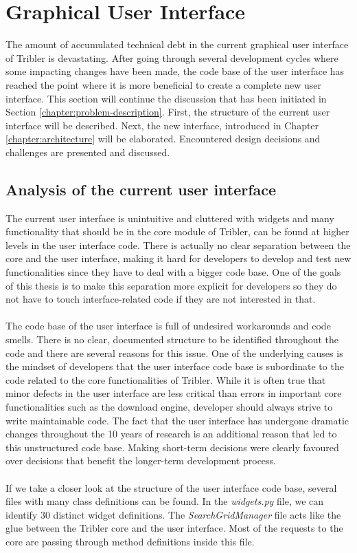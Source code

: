 \section{Graphical User Interface}
The amount of accumulated technical debt in the current graphical user interface of Tribler is devastating. After going through several development cycles where some impacting changes have been made, the code base of the user interface has reached the point where it is more beneficial to create a complete new user interface. This section will continue the discussion that has been initiated in Section \ref{chapter:problem-description}. First, the structure of the current user interface will be described. Next, the new interface, introduced in Chapter \ref{chapter:architecture} will be elaborated. Encountered design decisions and challenges are presented and discussed.

\subsection{Analysis of the current user interface}
The current user interface is unintuitive and cluttered with widgets and many functionality that should be in the core module of Tribler, can be found at higher levels in the user interface code. There is actually no clear separation between the core and the user interface, making it hard for developers to develop and test new functionalities since they have to deal with a bigger code base. One of the goals of this thesis is to make this separation more explicit for developers so they do not have to touch interface-related code if they are not interested in that.\\\\
The code base of the user interface is full of undesired workarounds and code smells. There is no clear, documented structure to be identified throughout the code and there are several reasons for this issue. One of the underlying causes is the mindset of developers that the user interface code base is subordinate to the code related to the core functionalities of Tribler. While it is often true that minor defects in the user interface are less critical than errors in important core functionalities such as the download engine, developer should always strive to write maintainable code. The fact that the user interface has undergone dramatic changes throughout the 10 years of research is an additional reason that led to this unstructured code base. Making short-term decisions were clearly favoured over decisions that benefit the longer-term development process.\\\\
If we take a closer look at the structure of the user interface code base, several files with many class definitions can be found. In the \emph{widgets.py} file, we can identify 30 distinct widget definitions. The \emph{SearchGridManager} file acts like the glue between the Tribler core and the user interface. Most of the requests to the core are passing through method definitions inside this file.

